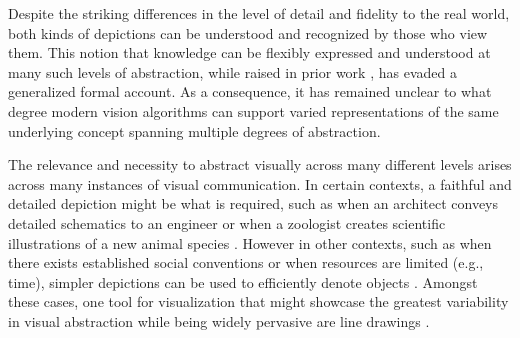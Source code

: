 \documentclass[10pt,letterpaper]{article}
\begin{document}
Despite the striking differences in the level of detail and fidelity to the real world, both kinds of depictions can be understood and recognized by those who view them. 
This notion that knowledge can be flexibly expressed and understood at many such levels of abstraction, while raised in prior work  \cite{viola2017pondering, chen2020foundations,mccloud1998understanding}, has evaded a generalized formal account. 
As a consequence, it has remained unclear to what degree modern vision algorithms can support varied representations of the same underlying concept spanning multiple degrees of abstraction.




The relevance and necessity to abstract visually across many different levels arises across many instances of visual communication.
In certain contexts, a faithful and detailed depiction might be what is required, such as when an architect conveys detailed schematics to an engineer \cite{suwa1997architects} or when a zoologist creates scientific illustrations of a new animal species \cite{baigrie1996picturing}. 
However in other contexts, such as when there exists established social conventions or when resources are limited (e.g., time), simpler depictions can be used to efficiently denote objects \cite{fan2020pragmatic, garrod2007foundations, hawkins2021visual}. 
Amongst these cases, one tool for visualization that might showcase the greatest variability in visual abstraction while being widely pervasive are line drawings \cite{sayim2011line}.
\end{document}
